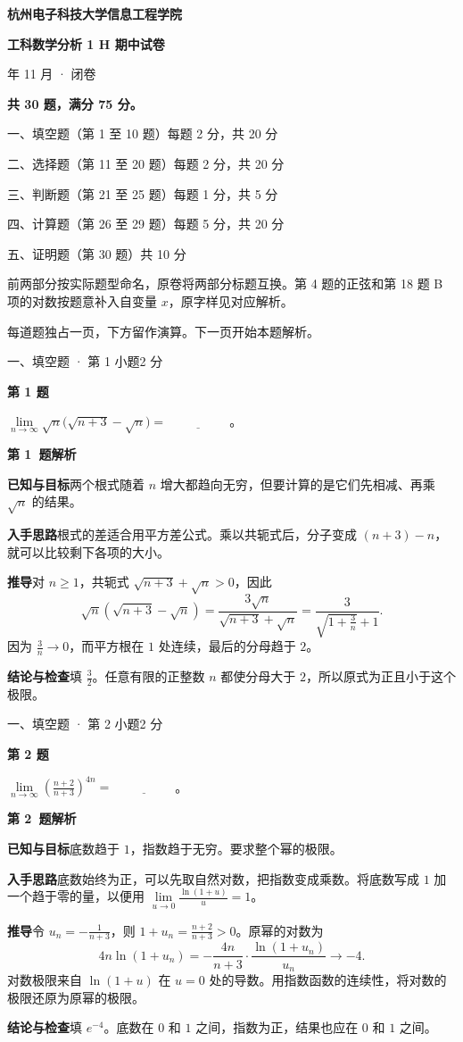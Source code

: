 \documentclass[UTF8,zihao=-4,fontset=fandol]{ctexart}
\newcommand{\blank}{\underline{\hspace{5em}}}
\newcommand{\Question}[4]{%
  \clearpage
  \def\CurrentNumber{#1}%
  \pdfbookmark[1]{第 #1 题}{q#1}%
  {\small #2 · 第 #3 小题\hfill #4 分}\par\medskip
  {\Large\bfseries 第 #1 题}\par\medskip
  \fontsize{14}{22}\selectfont
}
\newcommand{\Solution}{%
  \clearpage
  \fontsize{12}{18}\selectfont
  {\large\bfseries 第 \CurrentNumber\ 题解析}\par\smallskip
}
\newcommand{\Known}{\par\textbf{已知与目标}\quad}
\newcommand{\Method}{\par\textbf{入手思路}\quad}
\newcommand{\Derive}{\par\textbf{推导}\quad}
\newcommand{\Verify}{\par\textbf{结论与检查}\quad}
\begin{document}
{\Large\bfseries 杭州电子科技大学信息工程学院\par}
\medskip
{\Huge\bfseries 工科数学分析 1 H 期中试卷\par}
 年 11 月 · 闭卷

\bigskip
\textbf{共 30 题，满分 75 分。}

一、填空题（第 1 至 10 题）\hfill 每题 2 分，共 20 分\par
二、选择题（第 11 至 20 题）\hfill 每题 2 分，共 20 分\par
三、判断题（第 21 至 25 题）\hfill 每题 1 分，共 5 分\par
四、计算题（第 26 至 29 题）\hfill 每题 5 分，共 20 分\par
五、证明题（第 30 题）\hfill 共 10 分\par

\bigskip
前两部分按实际题型命名，原卷将两部分标题互换。第 4 题的正弦和第 18 题 B 项的对数按题意补入自变量 $x$，原字样见对应解析。

每道题独占一页，下方留作演算。下一页开始本题解析。

\Question{1}{一、填空题}{1}{2}
$\lim\limits_{n\to\infty}\sqrt{n}\bigl(\sqrt{n+3}-\sqrt{n}\bigr)=\blank$。

\Solution
\Known 两个根式随着 $n$ 增大都趋向无穷，但要计算的是它们先相减、再乘 $\sqrt n$ 的结果。
\Method 根式的差适合用平方差公式。乘以共轭式后，分子变成 $(n+3)-n$，就可以比较剩下各项的大小。
\Derive 对 $n\ge 1$，共轭式 $\sqrt{n+3}+\sqrt n>0$，因此
\[
\sqrt n(\sqrt{n+3}-\sqrt n)
=\frac{3\sqrt n}{\sqrt{n+3}+\sqrt n}
=\frac{3}{\sqrt{1+\frac{3}{n}}+1}.
\]
因为 $\frac{3}{n}\to0$，而平方根在 $1$ 处连续，最后的分母趋于 $2$。
\Verify 填 $\boxed{\frac32}$。任意有限的正整数 $n$ 都使分母大于 $2$，所以原式为正且小于这个极限。

\Question{2}{一、填空题}{2}{2}
$\lim\limits_{n\to\infty}\left(\frac{n+2}{n+3}\right)^{4n}=\blank$。

\Solution
\Known 底数趋于 $1$，指数趋于无穷。要求整个幂的极限。
\Method 底数始终为正，可以先取自然对数，把指数变成乘数。将底数写成 $1$ 加一个趋于零的量，以便用 $\lim\limits_{u\to0}\frac{\ln(1+u)}{u}=1$。
\Derive 令 $u_n=-\frac{1}{n+3}$，则 $1+u_n=\frac{n+2}{n+3}>0$。原幂的对数为
\[
4n\ln(1+u_n)
=-\frac{4n}{n+3}\cdot\frac{\ln(1+u_n)}{u_n}
\longrightarrow -4.
\]
对数极限来自 $\ln(1+u)$ 在 $u=0$ 处的导数。用指数函数的连续性，将对数的极限还原为原幂的极限。
\Verify 填 $\boxed{e^{-4}}$。底数在 $0$ 和 $1$ 之间，指数为正，结果也应在 $0$ 和 $1$ 之间。
\end{document}
